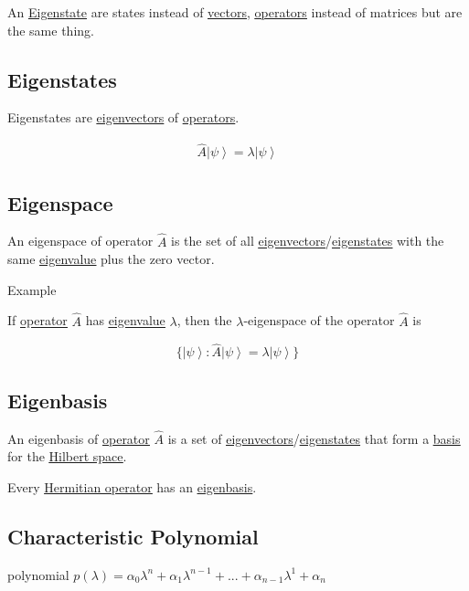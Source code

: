 \documentclass[
]{article}
\let\oldhyperref\hyperref
\renewcommand{\hyperref}[2][]{\oldhyperref[#1]{\underline{#2}}}
\providecommand{\ket}[1]{\left\lvert #1 \right\rangle}
\begin{document}
An \hyperref[eigenstates]{Eigenstate} are states instead of \hyperref[vectors]{vectors}, \hyperref[operators]{operators} instead of
matrices but are the same thing.

\subsection{Eigenstates}\label{eigenstates}
Eigenstates are \hyperref[eigenvectorseigenvalues]{eigenvectors} of \hyperref[operators]{operators}.

\begin{gather*}
	\hat{A}\ket{\psi}=\lambda\ket{\psi}
\end{gather*}

\subsection{Eigenspace}\label{eigenspaces}
An eigenspace of operator \(\hat{A}\) is the set of all \hyperref[eigenvectorseigenvalues]{eigenvectors}/\hyperref[eigenstates]{eigenstates} with the same \hyperref[eigenvectorseigenvalues]{eigenvalue} plus the zero vector.

Example

If \hyperref[operators]{operator} \(\hat{A}\) has \hyperref[eigenvectorseigenvalues]{eigenvalue} \(\lambda\), then the \(\lambda\)-eigenspace of the operator \(\hat{A}\) is

\[
	\{\ket{\psi}:\hat{A}\ket{\psi}=\lambda\ket{\psi}\}
\]

\subsection{Eigenbasis}\label{eigenbasis}
An eigenbasis of \hyperref[operators]{operator} \(\hat{A}\) is a set of \hyperref[eigenvectorseigenvalues]{eigenvectors}/\hyperref[eigenstates]{eigenstates} that form a \hyperref[basis-states]{basis} for the \hyperref[hilbert-spaces]{Hilbert space}.

Every \hyperref[hermitian-operators]{Hermitian operator} has an \hyperref[eigenbasis]{eigenbasis}.

\subsection{Characteristic Polynomial}\label{characteristic-polynomial}

polynomial
\(p(\lambda)=\alpha_0\lambda^n+\alpha_1\lambda^{n-1}+...+\alpha_{n-1}\lambda^{1}+\alpha_n\)
\end{document}
